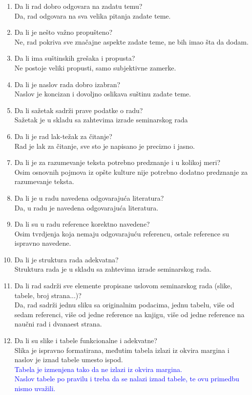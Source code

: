 \documentclass[a4paper]{report}
\newcommand{\odgovor}[1]{\textcolor{blue}{#1}}
\begin{document}
\begin{enumerate}
\item Da li rad dobro odgovara na zadatu temu?\\
Da, rad odgovara na sva velika pitanja zadate teme.
\item Da li je nešto važno propušteno?\\
Ne, rad pokriva sve značajne aspekte zadate teme, ne bih imao šta da dodam. 
\item Da li ima suštinskih grešaka i propusta?\\
Ne postoje veliki propusti, samo subjektivne zamerke.
\item Da li je naslov rada dobro izabran?\\
Naslov je koncizan i dovoljno oslikava suštinu zadate teme.
\item Da li sažetak sadrži prave podatke o radu?\\
Sažetak je u skladu sa zahtevima izrade seminarskog rada
\item Da li je rad lak-težak za čitanje?\\
Rad je lak za čitanje, sve sto je napisano je precizno i jasno.
\item Da li je za razumevanje teksta potrebno predznanje i u kolikoj meri?\\
Osim osnovnih pojmova iz opšte kulture nije potrebno dodatno predznanje za razumevanje teksta.
\item Da li je u radu navedena odgovarajuća literatura?\\
Da, u radu je navedena odgovarajuća literatura.
\item Da li su u radu reference korektno navedene?\\
Osim tvrdjenja koja nemaju odgovarajuću referencu, ostale reference su ispravno navedene. 
\item Da li je struktura rada adekvatna?\\
Struktura rada je u skladu sa zahtevima izrade seminarskog rada.
\item Da li rad sadrži sve elemente propisane uslovom seminarskog rada (slike, tabele, broj strana...)?\\
Da, rad sadrži jednu sliku sa originalnim podacima, jednu tabelu, više od sedam referenci, više od jedne reference na knjigu, više od jedne reference na naučni rad i dvanaest strana.
\item Da li su slike i tabele funkcionalne i adekvatne?\\
Slika je ispravno formatirana, međutim tabela izlazi iz okvira margina i naslov je iznad tabele umesto ispod.\\
\odgovor{Tabela je izmenjena tako da ne izlazi iz okvira margina.\\ Naslov tabele po pravilu i treba da se nalazi iznad tabele, te ovu primedbu nismo uvažili.}
\end{enumerate}
\end{document}
